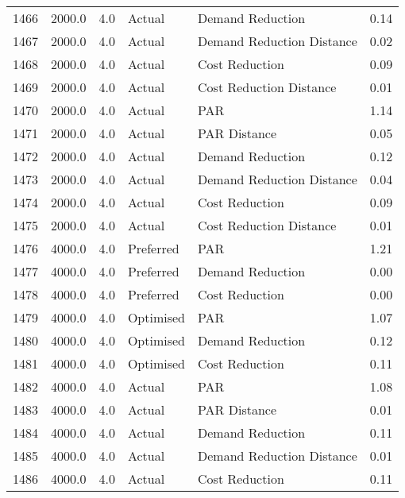 \begin{longtable}{lrrllr}
1466 &       2000.0 &     4.0 &         Actual &           Demand Reduction &   0.14 \\
1467 &       2000.0 &     4.0 &         Actual &  Demand Reduction Distance &   0.02 \\
1468 &       2000.0 &     4.0 &         Actual &             Cost Reduction &   0.09 \\
1469 &       2000.0 &     4.0 &         Actual &    Cost Reduction Distance &   0.01 \\
1470 &       2000.0 &     4.0 &         Actual &                        PAR &   1.14 \\
1471 &       2000.0 &     4.0 &         Actual &               PAR Distance &   0.05 \\
1472 &       2000.0 &     4.0 &         Actual &           Demand Reduction &   0.12 \\
1473 &       2000.0 &     4.0 &         Actual &  Demand Reduction Distance &   0.04 \\
1474 &       2000.0 &     4.0 &         Actual &             Cost Reduction &   0.09 \\
1475 &       2000.0 &     4.0 &         Actual &    Cost Reduction Distance &   0.01 \\
1476 &       4000.0 &     4.0 &      Preferred &                        PAR &   1.21 \\
1477 &       4000.0 &     4.0 &      Preferred &           Demand Reduction &   0.00 \\
1478 &       4000.0 &     4.0 &      Preferred &             Cost Reduction &   0.00 \\
1479 &       4000.0 &     4.0 &      Optimised &                        PAR &   1.07 \\
1480 &       4000.0 &     4.0 &      Optimised &           Demand Reduction &   0.12 \\
1481 &       4000.0 &     4.0 &      Optimised &             Cost Reduction &   0.11 \\
1482 &       4000.0 &     4.0 &         Actual &                        PAR &   1.08 \\
1483 &       4000.0 &     4.0 &         Actual &               PAR Distance &   0.01 \\
1484 &       4000.0 &     4.0 &         Actual &           Demand Reduction &   0.11 \\
1485 &       4000.0 &     4.0 &         Actual &  Demand Reduction Distance &   0.01 \\
1486 &       4000.0 &     4.0 &         Actual &             Cost Reduction &   0.11 \\

\end{longtable}
